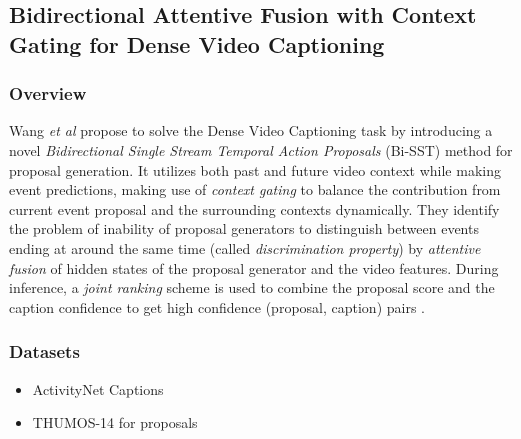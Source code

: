 \subsection{Bidirectional Attentive Fusion with Context Gating for Dense Video Captioning}

\subsubsection{Overview}
Wang \textit{et al} propose to solve the Dense Video Captioning task by introducing a novel 
\textit{Bidirectional Single Stream Temporal Action Proposals} (Bi-SST) method for proposal 
generation. It utilizes both past and future video context while making event predictions, 
making use of \textit{context gating} to balance the contribution from current event 
proposal and the surrounding contexts dynamically. They identify the problem of inability of 
proposal generators to distinguish between events ending at around the same time (called 
\textit{discrimination property}) by \textit{attentive fusion} of hidden states of the 
proposal generator and the video features. During inference, a \textit{joint ranking} scheme 
is used to combine the proposal score and the caption confidence to get high confidence 
(proposal, caption) pairs \cite{wang2018bidirectional}.\par 


\subsubsection{Datasets}
\begin{itemize}
\item ActivityNet Captions \cite{krishna2017densecaptioning}
\item THUMOS-14 \cite{thumos-14} for proposals
\end{itemize}

